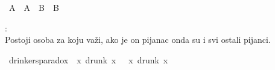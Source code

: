 \begin{isabellebody}
\begin{exercise}[subtitle=Klasična pravilo prirodne dedukcije: classical.]
\ {\isachardoublequoteopen}{\isacharparenleft}{\kern0pt}A\ {\isasymlongleftrightarrow}\ {\isacharparenleft}{\kern0pt}A\ {\isasymlongleftrightarrow}\ B{\isacharparenright}{\kern0pt}{\isacharparenright}{\kern0pt}\ {\isasymlongrightarrow}\ B{\isachardoublequoteclose}\isanewline
\ \ %
\isadelimproof
%
\endisadelimproof
%
\isatagproof
%
\endisatagproof
{\isafoldproof}%
%
\isadelimproof
%
\endisadelimproof
%
\begin{isamarkuptext}%
:\\
      Postoji osoba za koju važi, ako je on pijanac onda su i svi ostali pijanci.%
\end{isamarkuptext}\isamarkuptrue%
\isamarkupfalse%
\ drinker{\isacharprime}{\kern0pt}s{\isacharunderscore}{\kern0pt}paradox{\isacharcolon}{\kern0pt}\ {\isachardoublequoteopen}{\isasymexists}\ x{\isachardot}{\kern0pt}\ drunk\ x\ {\isasymlongrightarrow}\ {\isacharparenleft}{\kern0pt}{\isasymforall}\ x{\isachardot}{\kern0pt}\ drunk\ x{\isacharparenright}{\kern0pt}{\isachardoublequoteclose}\isanewline
\ \ %
\isadelimproof
%
\endisadelimproof
%
\isatagproof
%
\endisatagproof
{\isafoldproof}%
%
\isadelimproof
%
\endisadelimproof
%
\end{exercise}
%
\isadelimtheory
%
\endisadelimtheory
%
\isatagtheory
%
\endisatagtheory
{\isafoldtheory}%
%
\isadelimtheory
%
\endisadelimtheory
%
\end{isabellebody}%
\endinput
